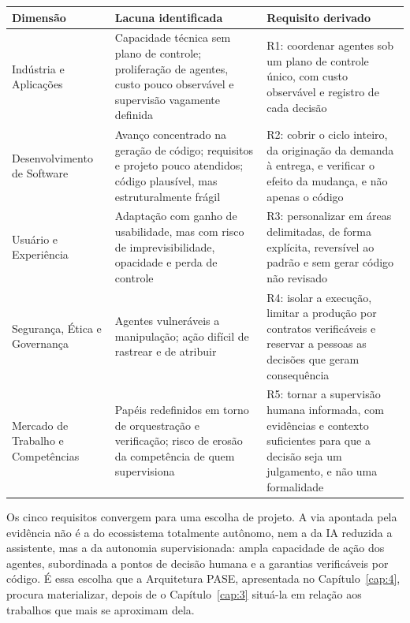 \begin{quadro}[htb]
\centering
\caption{Lacunas por dimensão e requisitos derivados para uma arquitetura de software agêntico}
\label{quadro:1}
\footnotesize
\renewcommand{\arraystretch}{1.25}
\begin{tabularx}{\textwidth}{|X|X|X|}
\hline
\textbf{Dimensão} & \textbf{Lacuna identificada} & \textbf{Requisito derivado} \\
\hline
Indústria e Aplicações & Capacidade técnica sem plano de controle; proliferação de agentes, custo pouco observável e supervisão vagamente definida & R1: coordenar agentes sob um plano de controle único, com custo observável e registro de cada decisão \\
\hline
Desenvolvimento de Software & Avanço concentrado na geração de código; requisitos e projeto pouco atendidos; código plausível, mas estruturalmente frágil & R2: cobrir o ciclo inteiro, da originação da demanda à entrega, e verificar o efeito da mudança, e não apenas o código \\
\hline
Usuário e Experiência & Adaptação com ganho de usabilidade, mas com risco de imprevisibilidade, opacidade e perda de controle & R3: personalizar em áreas delimitadas, de forma explícita, reversível ao padrão e sem gerar código não revisado \\
\hline
Segurança, Ética e Governança & Agentes vulneráveis a manipulação; ação difícil de rastrear e de atribuir & R4: isolar a execução, limitar a produção por contratos verificáveis e reservar a pessoas as decisões que geram consequência \\
\hline
Mercado de Trabalho e Competências & Papéis redefinidos em torno de orquestração e verificação; risco de erosão da competência de quem supervisiona & R5: tornar a supervisão humana informada, com evidências e contexto suficientes para que a decisão seja um julgamento, e não uma formalidade \\
\hline
\end{tabularx}
\end{quadro}

Os cinco requisitos convergem para uma escolha de projeto. A via apontada pela evidência não é a do ecossistema totalmente autônomo, nem a da IA reduzida a assistente, mas a da autonomia supervisionada: ampla capacidade de ação dos agentes, subordinada a pontos de decisão humana e a garantias verificáveis por código. É essa escolha que a Arquitetura PASE, apresentada no Capítulo~\ref{cap:4}, procura materializar, depois de o Capítulo~\ref{cap:3} situá-la em relação aos trabalhos que mais se aproximam dela.
